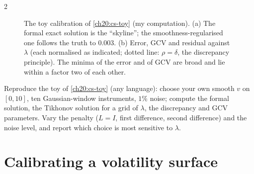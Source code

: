 \begin{paracol}{2}
\begin{figure}[ht]
\caption{The toy calibration of \cref{ch20:cs-toy} (my computation). (a) The formal exact solution is the ``skyline''; the smoothness-regularised one follows the truth to $0.003$. (b) Error, GCV and residual against $\lambda$ (each normalised as indicated; dotted line: $\rho=\delta$, the discrepancy principle). The minima of the error and of GCV are broad and lie within a factor two of each other.}\label{ch20:fig-toy}
\end{figure}

\begin{exercise}
Reproduce the toy of \cref{ch20:cs-toy} (any language): choose your own smooth $v$ on $[0,10]$, ten Gaussian-window instruments, $1\%$ noise; compute the formal solution, the Tikhonov solution for a grid of $\lambda$, the discrepancy and GCV parameters. Vary the penalty ($L=I$, first difference, second difference) and the noise level, and report which choice is most sensitive to $\lambda$.
\end{exercise}

\section{Calibrating a volatility surface}\label{ch20:sec-vol}


\end{paracol}
